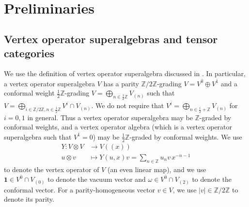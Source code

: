 \documentclass[11pt, reqno]{amsart}
\theoremstyle{definition}\newtheorem{defi}[thm]{Definition}
\theoremstyle{definition}\newtheorem{rem}[thm]{Remark}
\theoremstyle{definition}\newtheorem{exam}[thm]{Example}
\theoremstyle{definition}\newtheorem{assum}[thm]{Assumption}
\newcommand{\ZZ}{\mathbb{Z}}
\newcommand{\vac}{\mathbf{1}}
\newcommand{\even}{\overline{0}}
\newcommand{\odd}{\overline{1}}
\begin{document}
\section{Preliminaries}

\subsection{Vertex operator superalgebras and tensor categories}\label{sec:prelim}

We use the definition of vertex operator superalgebra discussed in \cite[Section 3.1]{CKM-exts}. In particular, a vertex operator superalgebra $V$ has a parity $\ZZ/2\ZZ$-grading $V=V^{\even}\oplus V^{\odd}$ and a conformal weight $\frac{1}{2}\ZZ$-grading $V=\bigoplus_{n\in\frac{1}{2}\ZZ} V_{(n)}$ such that $V=\bigoplus_{i\in\ZZ/2\ZZ, n\in\frac{1}{2}\ZZ} V^i\cap V_{(n)}$. We do not require that $V^{\overline{i}}=\bigoplus_{n\in\frac{i}{2}+\ZZ} V_{(n)}$ for $i=0,1$ in general. Thus a vertex operator superalgebra may be $\ZZ$-graded by conformal weights, and a vertex operator algebra (which is a vertex operator superalgebra such that $V^{\odd}=0$) may be $\frac{1}{2}\ZZ$-graded by conformal weights. We use
\begin{align*}
Y: V\otimes V & \rightarrow V((x))\nonumber\\
 u\otimes v & \mapsto Y(u,x)v=\sum_{n\in\ZZ} u_n v\,x^{-n-1}
\end{align*}
to denote the vertex operator of $V$ (an even linear map), and we use $\vac\in V^{\even}\cap V_{(0)}$ to denote the vacuum vector and $\omega\in V^{\even}\cap V_{(2)}$ to denote the conformal vector. For a parity-homogeneous vector $v\in V$, we use $\vert v\vert\in\ZZ/2\ZZ$ to denote its parity.
\end{document}
